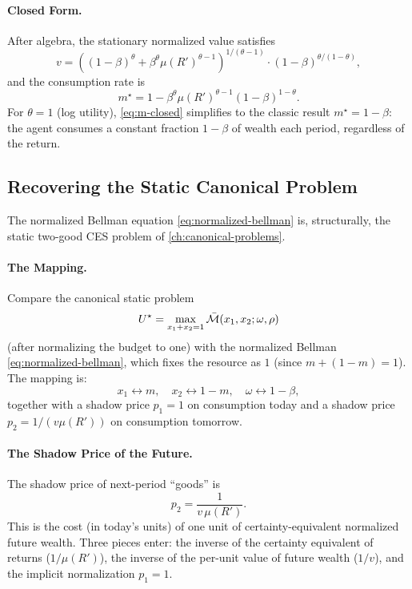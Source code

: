 \paragraph{Closed Form.}
After algebra, the stationary normalized value satisfies
\begin{equation}
v = \left( (1-\beta)^\theta + \beta^\theta \mu(R')^{\theta - 1} \right)^{1/(\theta - 1)} \cdot (1-\beta)^{\theta/(1-\theta)},
\label{eq:v-closed}
\end{equation}
and the consumption rate is
\begin{equation}
m^\star = 1 - \beta^\theta \mu(R')^{\theta - 1} (1-\beta)^{1-\theta}.
\label{eq:m-closed}
\end{equation}
For $\theta = 1$ (log utility), \cref{eq:m-closed} simplifies to the classic result $m^\star = 1 - \beta$: the agent consumes a constant fraction $1-\beta$ of wealth each period, regardless of the return.

\subsection{Recovering the Static Canonical Problem}
\label{subsec:dp-static-recovery}

The normalized Bellman equation \cref{eq:normalized-bellman} is, structurally, the static two-good CES problem of \cref{ch:canonical-problems}.

\paragraph{The Mapping.}
Compare the canonical static problem
\begin{equation}
U^\star = \max_{x_1 + x_2 = 1} \bar{\mathcal{M}}(x_1, x_2; \omega, \rho)
\label{eq:static-canonical}
\end{equation}
(after normalizing the budget to one) with the normalized Bellman \cref{eq:normalized-bellman}, which fixes the resource as $1$ (since $m + (1-m) = 1$). The mapping is:
\[
x_1 \leftrightarrow m, \quad x_2 \leftrightarrow 1 - m, \quad \omega \leftrightarrow 1 - \beta,
\]
together with a shadow price $p_1 = 1$ on consumption today and a shadow price $p_2 = 1/(v \mu(R'))$ on consumption tomorrow.

\paragraph{The Shadow Price of the Future.}
The shadow price of next-period ``goods'' is
\begin{equation}
p_2 = \frac{1}{v \, \mu(R')}.
\label{eq:shadow-price}
\end{equation}
This is the cost (in today's units) of one unit of certainty-equivalent normalized future wealth. Three pieces enter: the inverse of the certainty equivalent of returns ($1/\mu(R')$), the inverse of the per-unit value of future wealth ($1/v$), and the implicit normalization $p_1 = 1$.

